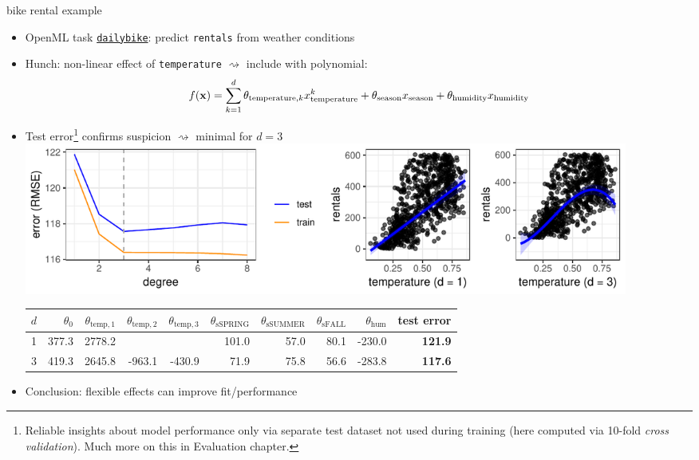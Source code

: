 \documentclass[11pt,compress,t,notes=noshow, xcolor=table]{beamer}
\begin{document}
\begin{frame}{bike rental example}

\begin{itemize}
    \footnotesize
    \item OpenML task \href{https://www.openml.org/search?type=data&sort=runs&id=45103&status=active}{
    \texttt{dailybike}}: predict \texttt{rentals} from weather conditions
    \item Hunch: non-linear effect of \texttt{temperature} $\rightsquigarrow$
    include with polynomial:
    \[
        f(\mathbf{x}) = \sum_{k=1}^d \theta_{\text{temperature}, k}
        x_{\text{temperature}}^k + \theta_{\text{season}} x_{\text{season}} +
        \theta_{\text{humidity}} x_{\text{humidity}}
    \]
    \item Test error\footnote[frame]{
    \scriptsize
    Reliable insights about model performance only via separate test
    dataset not used during training (here computed via 10-fold
    \textit{cross validation}). Much more on this in Evaluation chapter.
    } confirms suspicion $\rightsquigarrow$ minimal
    for $d = 3$
    \vfill
    \includegraphics[width=0.9\textwidth]{figure/reg_poly_bike}
    \tiny
    \begin{tabular}{rrrrrrrrrr}
        $d$ & $\theta_0$ & $\theta_{\text{temp}, 1}$ & $\theta_{\text{temp}, 2}$
        & $\theta_{\text{temp}, 3}$ & $\theta_{\text{sSPRING}}$ &
        $\theta_{\text{sSUMMER}}$ & $\theta_{\text{sFALL}}$ &
        $\theta_{\text{hum}}$ & \textbf{test error} \\ \hline
        1 & 377.3 & 2778.2 & & & 101.0 & 57.0 & 80.1 & -230.0 & \textbf{121.9}\\
        \rowcolor{black!10}
        3 & 419.3 & 2645.8 & -963.1 & -430.9 & 71.9 & 75.8 & 56.6 & -283.8 &
        \textbf{117.6}
    \end{tabular}
    \vfill
    \footnotesize
    \item Conclusion: flexible effects can improve fit/performance
\end{itemize}

\end{frame}



\endlecture
\end{document}
